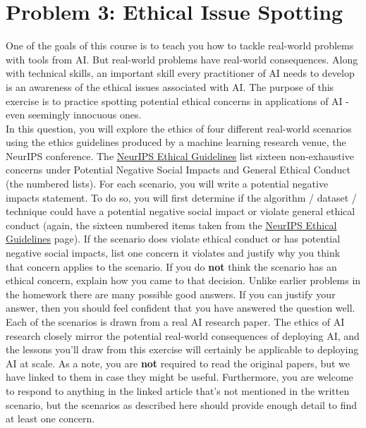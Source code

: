 \documentclass{article}
\theoremstyle{case}
\theoremstyle{definition}
\begin{document}
\section*{Problem 3: Ethical Issue Spotting}
One of the goals of this course is to teach you how to tackle real-world problems with tools from AI.  But real-world problems have real-world consequences. Along with technical skills, an important skill every practitioner of AI needs to develop is an awareness of the ethical issues associated with AI. The purpose of this exercise is to practice spotting potential ethical concerns in applications of AI - even seemingly innocuous ones. \\
In this question, you will explore the ethics of four different real-world scenarios using the ethics guidelines produced by a machine learning research venue, the NeurIPS conference. The \underline{\href{https://neurips.cc/public/EthicsGuidelines}{NeurIPS Ethical Guidelines}} list sixteen non-exhaustive concerns under Potential Negative Social Impacts and General Ethical Conduct (the numbered lists). For each scenario, you will write a potential negative impacts statement. To do so, you will first determine if the algorithm / dataset / technique could have a potential negative
social impact or violate general ethical conduct (again, the sixteen numbered items taken from the \underline{\href{https://neurips.cc/public/EthicsGuidelines}{NeurIPS Ethical Guidelines}} page). If the scenario does violate ethical conduct or has potential negative social impacts, list one concern it violates and justify why you think that concern applies to the scenario. If you do \textbf{not} think the scenario has an ethical concern, explain how you came to that decision. 
Unlike earlier problems in the homework there are many possible good answers. If you can justify your answer, then you should feel confident that you have answered the question well. \\
Each of the scenarios is drawn from a real AI research paper. The ethics of AI research closely mirror the potential real-world consequences of deploying AI, and the lessons you’ll draw from this exercise will certainly be applicable to deploying AI at scale. As a note, you are \textbf{not} required to read the original papers, but we have linked to them in case they might be useful. Furthermore, you are welcome to respond to anything in the linked article that's not mentioned in the written scenario, but the scenarios as described here should provide enough detail to find at least one concern.
\end{document}
